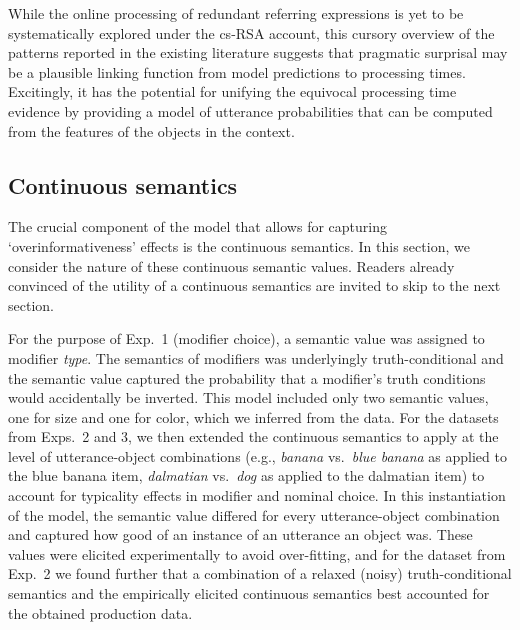 \documentclass[11pt]{article}
\newcommand{\tableref}[1]{Table \ref{#1}}
\begin{document}
While the online processing of redundant referring expressions is yet to be systematically explored under the cs-RSA account, this cursory overview of the patterns reported in the existing literature suggests that pragmatic surprisal may be a plausible linking function from model predictions to processing times. Excitingly, it has the potential for unifying the equivocal processing time evidence by providing a model of utterance probabilities that can be computed from the features of the objects in the context.


\subsection{Continuous semantics}
\label{sec:contsemantics}

The crucial component of the model that allows for capturing `overinformativeness' effects is the continuous semantics.  In this section, we consider the nature of these continuous semantic values. Readers already convinced of the utility of a continuous semantics are invited to skip to the next section.

For the purpose of Exp.~1 (modifier choice), a semantic value was assigned to modifier \emph{type}. The semantics of modifiers was underlyingly truth-conditional and the semantic value captured the probability that a modifier's truth conditions would accidentally be inverted. This model included only two semantic values, one for size and one for color, which we inferred from the data. For the datasets from Exps.~2 and 3, we then extended the continuous semantics to apply at the level of utterance-object  combinations (e.g., \emph{banana} vs.~\emph{blue banana} as applied to the blue banana item, \emph{dalmatian} vs.~\emph{dog} as applied to the dalmatian item) to account for typicality effects in modifier and nominal choice. In this instantiation of the model, the semantic value differed for every utterance-object combination and captured how good of an instance of an utterance an object was. These values were elicited experimentally to avoid over-fitting, and for the dataset from Exp.~2 we found further that a combination of a relaxed (noisy) truth-conditional semantics and the empirically elicited continuous semantics best accounted for the obtained production data. %

\end{document}
